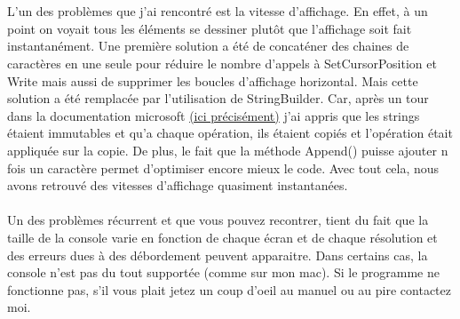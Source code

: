 \documentclass[11pt]{article}
\begin{document}
    \vspace{\baselineskip}
    \\\\
    L'un des problèmes que j'ai rencontré est la vitesse d'affichage. En effet, à un point on voyait tous les éléments se dessiner plutôt que l'affichage soit fait instantanément. Une première solution a été de concaténer des chaines de caractères en une seule pour réduire le nombre d'appels  à SetCursorPosition et Write mais aussi de supprimer les boucles d'affichage horizontal. Mais cette solution a été remplacée par l'utilisation de StringBuilder. Car, après un tour dans la documentation microsoft \href{https://docs.microsoft.com/fr-fr/dotnet/api/system.string?view=netcore-3.1}{(ici précisément)} j'ai appris que les strings étaient immutables et qu'a chaque opération, ils étaient copiés et l'opération était appliquée sur la copie. De plus, le fait que la méthode Append() puisse ajouter n fois un caractère permet d'optimiser encore mieux le code. Avec tout cela, nous avons retrouvé des vitesses d'affichage quasiment instantanées. 
    \\\\
    Un des problèmes récurrent et que vous pouvez recontrer, tient du fait que la taille de la console varie en fonction de chaque écran et de chaque résolution et des erreurs dues à des débordement peuvent apparaitre. Dans certains cas, la console n'est pas du tout supportée (comme sur mon mac).
    Si le programme ne fonctionne pas, s'il vous plait jetez un coup d'oeil au manuel ou au pire contactez moi.
\end{document}
